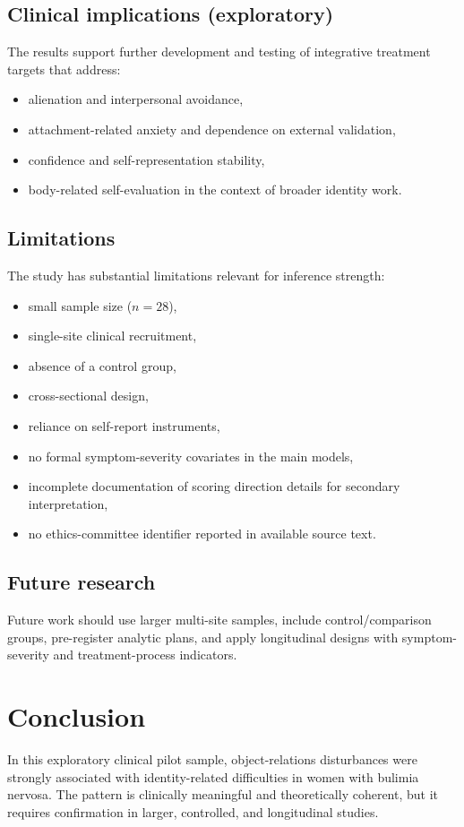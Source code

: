 \documentclass[12pt]{article}
\begin{document}
\subsection{Clinical implications (exploratory)}
The results support further development and testing of integrative treatment targets that address:
\begin{itemize}[leftmargin=*]
    \item alienation and interpersonal avoidance,
    \item attachment-related anxiety and dependence on external validation,
    \item confidence and self-representation stability,
    \item body-related self-evaluation in the context of broader identity work.
\end{itemize}

\subsection{Limitations}
The study has substantial limitations relevant for inference strength:
\begin{itemize}[leftmargin=*]
    \item small sample size ($n=28$),
    \item single-site clinical recruitment,
    \item absence of a control group,
    \item cross-sectional design,
    \item reliance on self-report instruments,
    \item no formal symptom-severity covariates in the main models,
    \item incomplete documentation of scoring direction details for secondary interpretation,
    \item no ethics-committee identifier reported in available source text.
\end{itemize}

\subsection{Future research}
Future work should use larger multi-site samples, include control/comparison groups, pre-register analytic plans, and apply longitudinal designs with symptom-severity and treatment-process indicators.

\section{Conclusion}
In this exploratory clinical pilot sample, object-relations disturbances were strongly associated with identity-related difficulties in women with bulimia nervosa. The pattern is clinically meaningful and theoretically coherent, but it requires confirmation in larger, controlled, and longitudinal studies.
\end{document}
